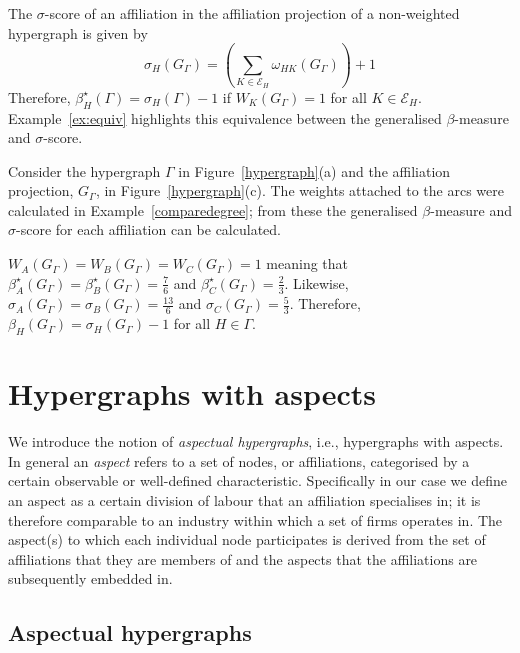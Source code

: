 The $\sigma$-score of an affiliation in the affiliation projection of a non-weighted hypergraph is given by
\begin{equation}
\sigma_{H}(G_{\Gamma}) = \left( \sum_{K \in \mathcal{E}_{H}} \omega_{HK}(G_{\Gamma}) \right) + 1
\end{equation}
Therefore, $\beta^{\star}_{H}(\Gamma) = \sigma_{H}(\Gamma) - 1$ if $W_{K}(G_{\Gamma}) = 1$ for all $K \in \mathcal{E}_{H}$. Example~\ref{ex:equiv} highlights this equivalence between the generalised $\beta$-measure and $\sigma$-score.

\begin{example} \label{ex:equiv}
Consider the hypergraph $\Gamma$ in Figure~\ref{hypergraph}(a) and the affiliation projection, $G_{\Gamma}$, in Figure~\ref{hypergraph}(c). The weights attached to the arcs were calculated in Example~\ref{comparedegree}; from these the generalised $\beta$-measure and $\sigma$-score for each affiliation can be calculated.

$W_{A}(G_{\Gamma}) = W_{B}(G_{\Gamma}) = W_{C}(G_{\Gamma}) = 1$ meaning that $\beta^{\star}_{A}(G_{\Gamma}) =\beta^{\star}_{B}(G_{\Gamma}) = \frac{7}{6}$ and $\beta^{\star}_{C}(G_{\Gamma}) = \frac{2}{3}$. Likewise, $\sigma_{A}(G_{\Gamma}) = \sigma_{B}(G_{\Gamma}) = \frac{13}{6}$ and $\sigma_{C}(G_{\Gamma}) = \frac{5}{3}$. Therefore, $\beta_{H}(G_{\Gamma}) = \sigma_{H}(G_{\Gamma}) - 1$ for all $H \in \Gamma$.
\end{example}

\section{Hypergraphs with aspects} \label{Theory:Elites}

We introduce the notion of \emph{aspectual hypergraphs}, i.e., hypergraphs with aspects. In general an \emph{aspect} refers to a set of nodes, or affiliations, categorised by a certain observable or well-defined characteristic. Specifically in our case we define an aspect as a certain division of labour that an affiliation specialises in; it is therefore comparable to an industry within which a set of firms operates in. The aspect(s) to which each individual node participates is derived from the set of affiliations that they are members of and the aspects that the affiliations are subsequently embedded in.

\subsection{Aspectual hypergraphs}


